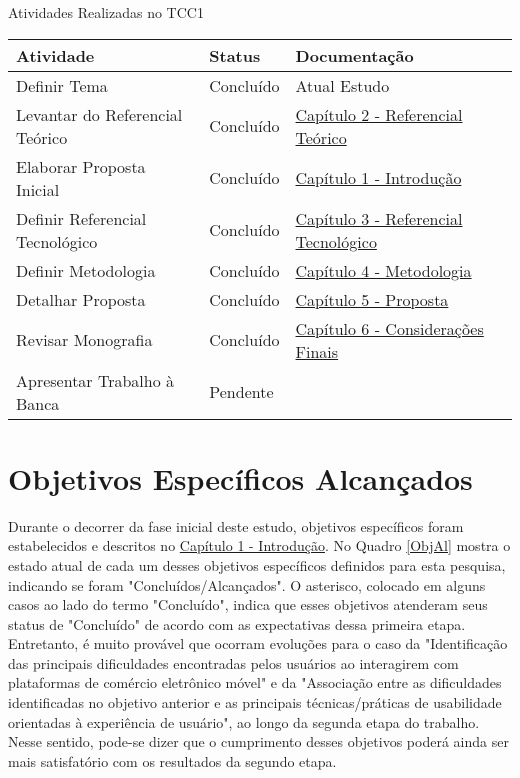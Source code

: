 \begin{quadro}
\caption{\label{AtivTCC1}Atividades Realizadas no TCC1}
\centering

\begin{tabular}{|l|l|l|}
\hline
\textbf{Atividade}               & \textbf{Status} & \textbf{Documentação} \\ \hline
Definir Tema                     & Concluído       &  Atual Estudo                     \\ \hline
Levantar do Referencial Teórico  & Concluído       &    \hyperref[chap:ReferencialTeorico]{Capítulo 2 - Referencial Teórico}                   \\ \hline
Elaborar Proposta Inicial        & Concluído       &    \hyperref[chap:Introducao]{Capítulo 1 - Introdução}                   \\ \hline
Definir Referencial Tecnológico  & Concluído       &     \hyperref[chap:ReferencialTecnologico]{Capítulo 3 - Referencial Tecnológico}                  \\ \hline
Definir Metodologia              & Concluído       &   \hyperref[chap:Metodologia]{Capítulo 4 - Metodologia}                    \\ \hline
Detalhar Proposta                & Concluído       &    \hyperref[chap:Proposta]{Capítulo 5 - Proposta}                   \\ \hline
Revisar Monografia               & Concluído       &  \hyperref[chap:ConsideracoesFinais]{Capítulo 6 - Considerações Finais}                     \\ \hline
Apresentar Trabalho à Banca      &       Pendente          &                       \\ \hline
\end{tabular}

\end{quadro} 

\section{Objetivos Específicos Alcançados}
\label{obesp}

Durante o decorrer da fase inicial deste estudo, objetivos específicos foram estabelecidos e descritos no \hyperref[chap:Introducao]{Capítulo 1 - Introdução}. No Quadro \ref{ObjAl} mostra o estado atual de cada um desses objetivos específicos definidos para esta pesquisa, indicando se foram "Concluídos/Alcançados". O asterisco, colocado em alguns casos ao lado do termo "Concluído", indica que esses objetivos atenderam seus status de "Concluído" de acordo com as expectativas dessa primeira etapa. Entretanto, é muito provável que ocorram evoluções para o caso da "Identificação das principais dificuldades encontradas pelos usuários ao interagirem com plataformas de comércio
eletrônico móvel" e da "Associação entre as dificuldades identificadas no objetivo anterior e as principais técnicas/práticas de usabilidade orientadas à experiência de usuário", ao longo da segunda etapa do trabalho. Nesse sentido, pode-se dizer que o cumprimento desses objetivos poderá ainda ser mais satisfatório com os resultados da segundo etapa.

